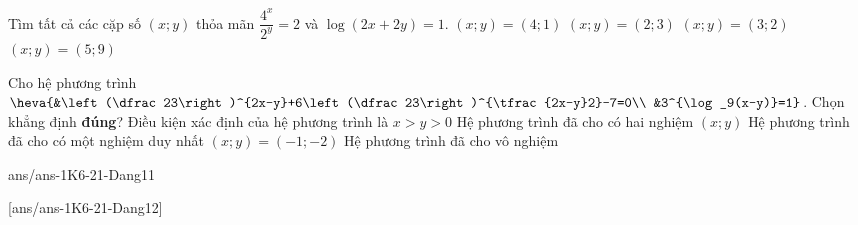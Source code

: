 \begin{ex}%
	Tìm tất cả các cặp số $(x; y)$ thỏa mãn $\dfrac{4^x}{2^y}=2$ và $\log (2x+2y)=1$.
	\choice
	{$(x ; y)=(4 ; 1)$}
	{\True $(x ; y)=(2 ; 3)$}
	{$(x ; y)=(3 ; 2)$}
	{$(x ; y)=(5 ; 9)$}
\end{ex}



\begin{ex}%
	Cho hệ phương trình $\heva{&\left(\dfrac 23\right)^{2x-y}+6\left(\dfrac 23\right)^{\tfrac{2x-y}2}-7=0\\ &3^{\log_9(x-y)}=1}$. Chọn khẳng định \textbf{đúng}?
	\choice
	{Điều kiện xác định của hệ phương trình là $x>y>0$}
	{Hệ phương trình đã cho có hai nghiệm $(x ; y)$}
	{\True Hệ phương trình đã cho có một nghiệm duy nhất $(x ; y)=(-1 ;-2)$}
	{Hệ phương trình đã cho vô nghiệm}
\end{ex}





\begin{indapan}{10}
{ans/ans-1K6-21-Dang11}
\end{indapan}
[ans/ans-1K6-21-Dang12]


